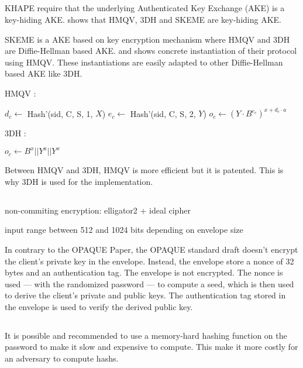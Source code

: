 \documentclass[../report.tex]{subfiles}
\begin{document}
\subsection{}
KHAPE require that the underlying Authenticated Key Exchange (AKE) is a key-hiding AKE.
\cite{KHAPE_Paper} shows that HMQV, 3DH and SKEME are key-hiding AKE.

SKEME is a AKE based on key encryption mechanism where HMQV and 3DH are Diffie-Hellman based AKE.
\cite{OPAQUE_Paper} and \cite{KHAPE_Paper} shows concrete instantiation of their protocol using HMQV. These instantiations are easily adapted to other Diffie-Hellman based AKE like 3DH.

HMQV :
\begin{algorithmic}
\State $d_c \gets$ Hash'(sid, C, S, 1, $X$)
\State $e_c \gets$ Hash'(sid, C, S, 2, $Y$)
\State $o_c \gets (Y \cdot B^{e_c})^{x+d_c \cdot a}$
\end{algorithmic}

3DH :
\begin{algorithmic}
\State $o_c \gets B^x || Y^a || Y^x$
\end{algorithmic}

Between HMQV and 3DH, HMQV is more efficient but it is patented. This is why 3DH is used for the implementation.

\subsection{}
non-commiting encryption: elligator2 + ideal cipher

input range between 512 and 1024 bits depending on envelope size


In contrary to the OPAQUE Paper, the OPAQUE standard draft doesn't encrypt the client's private key in the envelope.
Instead, the envelope store a nonce of 32 bytes and an authentication tag. The envelope is not encrypted.
The nonce is used --- with the randomized password --- to compute a seed, which is then used to derive the client's private and public keys. The authentication tag stored in the envelope is used to verify the derived public key.


\subsection{}
It is possible and recommended to use a memory-hard hashing function on the password to make it slow and expensive to compute. 
This make it more costly for an adversary to compute hashs.
\end{document}
